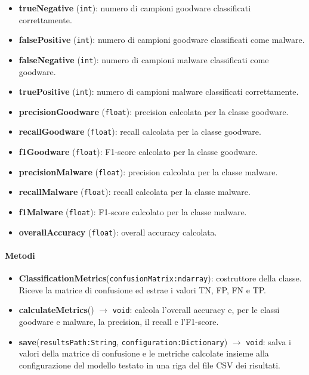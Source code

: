 \begin{itemize}
    \raggedright
    \item \textbf{trueNegative} (\texttt{int}): numero di campioni
    goodware classificati correttamente.
    \item \textbf{falsePositive} (\texttt{int}): numero di campioni
    goodware classificati come malware.
    \item \textbf{falseNegative} (\texttt{int}): numero di campioni
    malware classificati come goodware.
    \item \textbf{truePositive} (\texttt{int}): numero di campioni
    malware classificati correttamente.
    \item \textbf{precisionGoodware} (\texttt{float}): precision calcolata
    per la classe goodware.
    \item \textbf{recallGoodware} (\texttt{float}): recall calcolata per
    la classe goodware.
    \item \textbf{f1Goodware} (\texttt{float}): F1-score calcolato per la
    classe goodware.
    \item \textbf{precisionMalware} (\texttt{float}): precision calcolata
    per la classe malware.
    \item \textbf{recallMalware} (\texttt{float}): recall calcolata per la
    classe malware.
    \item \textbf{f1Malware} (\texttt{float}): F1-score calcolato per la
    classe malware.
    \item \textbf{overallAccuracy} (\texttt{float}): overall accuracy
    calcolata.
\end{itemize}

\paragraph{Metodi}

\begin{itemize}
    \raggedright
    \item \textbf{ClassificationMetrics}(\texttt{confusionMatrix:ndarray}):
    costruttore della classe. Riceve la matrice di confusione ed estrae i
    valori TN, FP, FN e TP.
    \item \textbf{calculateMetrics}() $\rightarrow$ \texttt{void}: calcola
    l’overall accuracy e, per le classi goodware e malware, la precision,
    il recall e l’F1-score.
    \item \textbf{save}(\texttt{resultsPath:String},
    \texttt{configuration:Dictionary}) $\rightarrow$ \texttt{void}: salva
    i valori della matrice di confusione e le metriche calcolate insieme
    alla configurazione del modello testato in una riga del file CSV dei
    risultati.
\end{itemize}